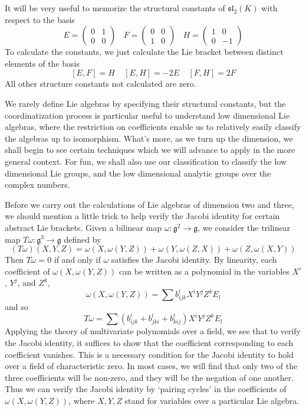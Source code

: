 \begin{example}
    It will be very useful to memorize the structural constants of $\mathfrak{sl}_2(K)$ with respect to the basis
    \[ E = \begin{pmatrix} 0 & 1 \\ 0 & 0 \end{pmatrix}\ \ \ \ F = \begin{pmatrix} 0 & 0 \\ 1 & 0 \end{pmatrix}\ \ \ \ H = \begin{pmatrix} 1 & 0 \\ 0 & -1 \end{pmatrix} \]
    To calculate the constants, we just calculate the Lie bracket between distinct elements of the basis
    \[ [E,F] = H\ \ \ \ \ [E,H] = -2E\ \ \ \ \ [F,H] = 2F \]
    All other structure constants not calculated are zero.
\end{example}

We rarely define Lie algebras by specifying their structural constants, but the coordinatization process is particular useful to understand low dimensional Lie algebras, where the restriction on coefficients enable us to relatively easily classify the algebras up to isomorphism. What's more, as we turn up the dimension, we shall begin to see certain techniques which we will advance to apply in the more general context. For fun, we shall also use our classification to classify the low dimensional Lie groups, and the low dimensional analytic groups over the complex numbers.

Before we carry out the calculations of Lie algebras of dimension two and three, we should mention a little trick to help verify the Jacobi identity for certain abstract Lie brackets. Given a bilinear map $\omega: \mathfrak{g}^2 \to \mathfrak{g}$, we consider the trilinear map $T\omega: \mathfrak{g}^3 \to \mathfrak{g}$ defined by
%
\[ (T \omega)(X,Y,Z) = \omega(X, \omega(Y,Z)) + \omega(Y,\omega(Z,X)) + \omega(Z,\omega(X,Y)) \]
%
Then $T \omega = 0$ if and only if $\omega$ satisfies the Jacobi identity. By linearity, each coefficient of $\omega(X,\omega(Y,Z))$ can be written as a polynomial in the variables $X^i$, $Y^j$, and $Z^k$,
%
\[ \omega(X, \omega(Y,Z)) = \sum b_{ijk}^l X^i Y^j Z^k E_l \]
%
and so
%
\[ T\omega = \sum (b_{ijk}^l + b_{jki}^l + b_{kij}^l) X^i Y^j Z^k E_l \]
%
Applying the theory of multivariate polynomials over a field, we see that to verify the Jacobi identity, it suffices to show that the coefficient corresponding to each coefficient vanishes. This is a necessary condition for the Jacobi identity to hold over a field of characteristic zero. In most cases, we will find that only two of the three coefficients will be non-zero, and they will be the negation of one another. Thus we can verify the Jacobi identity by `pairing cycles' in the coefficients of $\omega(X,\omega(Y,Z))$, where $X,Y,Z$ stand for variables over a particular Lie algebra.

